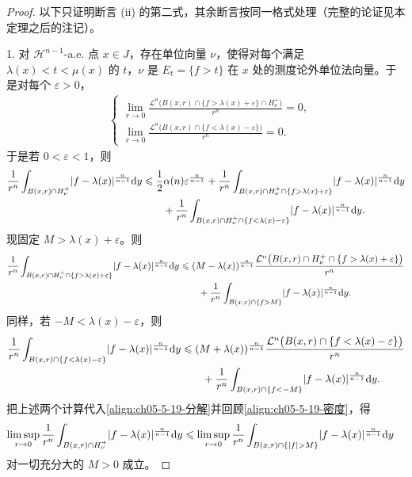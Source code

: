 \documentclass[../../main.tex]{subfiles}%
\begin{document}
\begin{proof}
以下只证明断言 (ii) 的第二式，其余断言按同一格式处理（完整的论证见本定理之后的注记）。

1. 对 $\mathcal{H}^{n-1}$-a.e. 点 $x\in J$，存在单位向量 $\nu$，使得对每个满足 $\lambda(x)<t<\mu(x)$ 的 $t$，$\nu$ 是 $E_t=\{f>t\}$ 在 $x$ 处的测度论外单位法向量。于是对每个 $\varepsilon>0$，
\begin{align}
&\begin{cases}
\displaystyle\lim_{r\to0}\frac{\mathcal{L}^n\bigl(B(x,r)\cap\{f>\lambda(x)+\varepsilon\}\cap H_\nu^+\bigr)}{r^n}=0,\\[10pt]
\displaystyle\lim_{r\to0}\frac{\mathcal{L}^n\bigl(B(x,r)\cap\{f<\lambda(x)-\varepsilon\}\bigr)}{r^n}=0 .
\end{cases}
\label{align:ch05-5-19-密度}
\end{align}
于是若 $0<\varepsilon<1$，则
\begin{align}
\frac{1}{r^n}\int_{B(x,r)\cap H_\nu^+}\lvert f-\lambda(x)\rvert^{\frac{n}{n-1}}\mathrm{d} y
&\leqslant\frac12\alpha(n)\varepsilon^{\frac{n}{n-1}}
+\frac{1}{r^n}\int_{B(x,r)\cap H_\nu^+\cap\{f>\lambda(x)+\varepsilon\}}\lvert f-\lambda(x)\rvert^{\frac{n}{n-1}}\mathrm{d} y\notag\\
&\qquad+\frac{1}{r^n}\int_{B(x,r)\cap H_\nu^+\cap\{f<\lambda(x)-\varepsilon\}}\lvert f-\lambda(x)\rvert^{\frac{n}{n-1}}\mathrm{d} y . \label{align:ch05-5-19-分解}
\end{align}
现固定 $M>\lambda(x)+\varepsilon$。则
\begin{align*}
\frac{1}{r^n}\int_{B(x,r)\cap H_\nu^+\cap\{f>\lambda(x)+\varepsilon\}}\lvert f-\lambda(x)\rvert^{\frac{n}{n-1}}\mathrm{d} y
&\leqslant(M-\lambda(x))^{\frac{n}{n-1}}\frac{\mathcal{L}^n\bigl(B(x,r)\cap H_\nu^+\cap\{f>\lambda(x)+\varepsilon\}\bigr)}{r^n}\\
&\qquad+\frac{1}{r^n}\int_{B(x,r)\cap\{f>M\}}\lvert f-\lambda(x)\rvert^{\frac{n}{n-1}}\mathrm{d} y .
\end{align*}
同样，若 $-M<\lambda(x)-\varepsilon$，则
\begin{align*}
\frac{1}{r^n}\int_{B(x,r)\cap\{f<\lambda(x)-\varepsilon\}}\lvert f-\lambda(x)\rvert^{\frac{n}{n-1}}\mathrm{d} y
&\leqslant(M+\lambda(x))^{\frac{n}{n-1}}\frac{\mathcal{L}^n\bigl(B(x,r)\cap\{f<\lambda(x)-\varepsilon\}\bigr)}{r^n}\\
&\qquad+\frac{1}{r^n}\int_{B(x,r)\cap\{f<-M\}}\lvert f-\lambda(x)\rvert^{\frac{n}{n-1}}\mathrm{d} y .
\end{align*}
把上述两个计算代入\eqref{align:ch05-5-19-分解}并回顾\eqref{align:ch05-5-19-密度}，得
\begin{align}
\limsup_{r\to0}\frac{1}{r^n}\int_{B(x,r)\cap H_\nu^+}\lvert f-\lambda(x)\rvert^{\frac{n}{n-1}}\mathrm{d} y
&\leqslant\limsup_{r\to0}\frac{1}{r^n}\int_{B(x,r)\cap\{\lvert f\rvert>M\}}\lvert f-\lambda(x)\rvert^{\frac{n}{n-1}}\mathrm{d} y \label{align:ch05-5-19-尾部}
\end{align}
对一切充分大的 $M>0$ 成立。


\end{proof}
\end{document}
